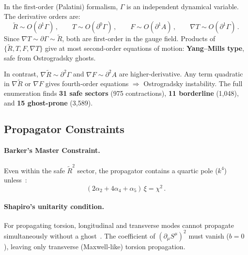 \documentclass[12pt,a4paper]{article}
\newcommand{\Rt}{\tilde{R}}         %
\newcommand{\del}{\nabla}            %
\newcommand{\pd}{\partial}           %
\begin{document}
In the first-order (Palatini) formalism, $\Gamma$ is an independent
dynamical variable. The derivative orders are:
\begin{equation}
  \Rt \sim O(\pd^1\Gamma)\,,\qquad
  T \sim O(\pd^0\Gamma)\,,\qquad
  F \sim O(\pd^1 A)\,,\qquad
  \del T \sim O(\pd^1\Gamma)\,.
  \label{eq:deriv_orders}
\end{equation}
Since $\del T \sim \pd\Gamma \sim \Rt$, both are first-order in the
gauge field. Products of $\{\Rt, T, F, \del T\}$ give at most
second-order equations of motion: \textbf{Yang--Mills type}, safe
from Ostrogradsky ghosts.

In contrast, $\del\Rt \sim \pd^2\Gamma$ and $\del F \sim \pd^2 A$
are higher-derivative. Any term quadratic in $\del\Rt$ or $\del F$
gives fourth-order equations $\Rightarrow$ Ostrogradsky instability.
The full enumeration finds \textbf{31 safe sectors} (975 contractions),
\textbf{11 borderline} (1,048), and \textbf{15 ghost-prone} (3,589).


\subsection{Propagator Constraints}
\label{sec:propagator}

\paragraph{Barker's Master Constraint.}
Even within the safe $\Rt^2$ sector, the propagator contains a quartic
pole ($k^4$) unless~\cite{Barker:2024ydb}:
\begin{equation}
  (2\alpha_2 + 4\alpha_4 + \alpha_5)\,\xi = \chi^2\,.
  \label{eq:master_constraint}
\end{equation}

\paragraph{Shapiro's unitarity condition.}
For propagating torsion, longitudinal and transverse modes cannot
propagate simultaneously without a ghost~\cite{Shapiro:2001rz}.
The coefficient of $(\pd_\mu S^\mu)^2$ must vanish ($b = 0$),
leaving only transverse (Maxwell-like) torsion propagation.
\end{document}
